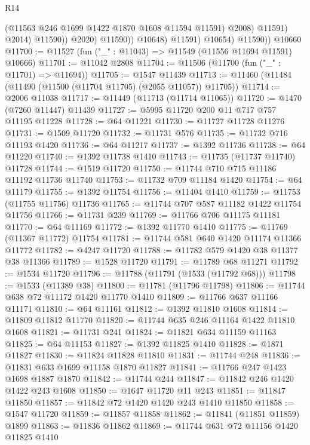 \begin{lexlean}{R14}
\begin{coremodule}
                              (@11563 @246 @1699 @1422 @1870 @1608 @11594 @11591)
                              @2008)
                            @11591)
                          @2014)
                        @11590))
                    @2020)
                  @11590))
              @10648)
            @11591)
          @10654)
        @11590))
    @10660
@11700 := @11527 (fun ("_" : @11043) => @11549 (@11556 @11694 @11591) @10666)
@11701 := @11042 @2808
@11704 := @11506 (@11700 (fun ("_" : @11701) => @11694))
@11705 := @1547 @11439
@11713 := @11460 (@11484 (@11490 (@11500 (@11704 @11705) (@2055 @11057)) @11705))
@11714 := @2006 @11038
@11717 := @11449 (@11713 (@11714 @11065))
@11720 := @1470 (@7260 @11447) @11439
@11727 := @5995 @11720 @200 @11 @717 @757 @11195 @11228
@11728 := @64 @11221
@11730 := @11727 @11728 @11276
@11731 := @1509 @11720
@11732 := @11731 @576
@11735 := @11732 @716 @11193 @1420
@11736 := @64 @11217
@11737 := @1392 @11736
@11738 := @64 @11220
@11740 := @1392 @11738 @1410
@11743 := @11735 (@11737 @11740) @11728
@11744 := @1519 @11720
@11750 := @11744 @710 @715 @11186 @11192 @11736 @11740
@11753 := @11732 @709 @11184 @1420
@11754 := @64 @11179
@11755 := @1392 @11754
@11756 := @11404 @1410
@11759 := @11753 (@11755 @11756) @11736
@11765 := @11744 @707 @587 @11182 @1422 @11754 @11756
@11766 := @11731 @239
@11769 := @11766 @706 @11175 @11181
@11770 := @64 @11169
@11772 := @1392 @11770 @1410
@11775 := @11769 (@11367 @11772) @11754
@11781 := @11744 @581 @640 @1420 @11174 @11366 @11772
@11782 := @4247 @11720
@11788 := @11782 @579 @1420 @38 @11377 @38 @11366
@11789 := @1528 @11720
@11791 := @11789 @68 @11271
@11792 := @1534 @11720
@11796 := @11788 (@11791 (@1533 (@11792 @68)))
@11798 := @1533 (@11389 @38)
@11800 := @11781 (@11796 @11798)
@11806 := @11744 @638 @72 @11172 @1420 @11770 @1410
@11809 := @11766 @637 @11166 @11171
@11810 := @64 @11161
@11812 := @1392 @11810 @1608
@11814 := @11809 @11812 @11770
@11820 := @11744 @635 @246 @11164 @1422 @11810 @1608
@11821 := @11731 @241
@11824 := @11821 @634 @11159 @11163
@11825 := @64 @11153
@11827 := @1392 @11825 @1410
@11828 := @1871 @11827
@11830 := @11824 @11828 @11810
@11831 := @11744 @248
@11836 := @11831 @633 @1699 @11158 @1870 @11827
@11841 := @11766 @247 @1423 @1698 @1887 @1870
@11842 := @11744 @244
@11847 := @11842 @246 @1420 @1422 @243 @1608
@11850 := @1647 @11720 @11 @243
@11851 := @11847 @11850
@11857 := @11842 @72 @1420 @1420 @243 @1410 @11850
@11858 := @1547 @11720
@11859 := @11857 @11858
@11862 := @11841 (@11851 @11859) @1899
@11863 := @11836 @11862
@11869 := @11744 @631 @72 @11156 @1420 @11825 @1410

\end{coremodule}
\end{lexlean}
